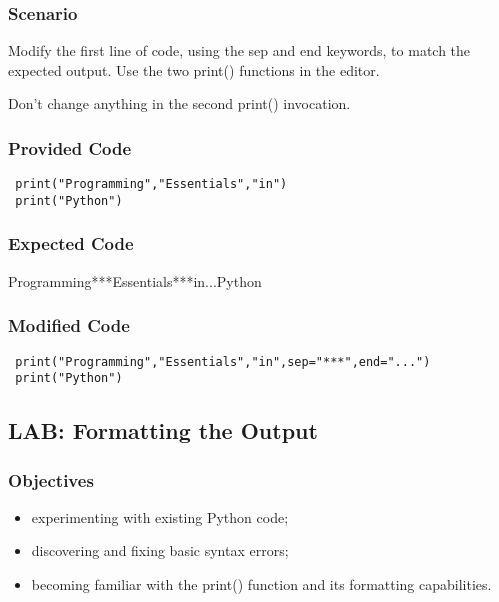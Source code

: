 \documentclass[a4paper,10pt]{article}
\begin{document}
\subsubsection{Scenario}
Modify the first line of code, using the {\selectfont sep} and {\selectfont end} keywords, to match the expected output. Use the two {\selectfont print()} functions in the editor.
\newline

Don't change anything in the second {\selectfont print()} invocation.
\newline

\subsubsection{Provided Code}
\begin{verbatim}
 print("Programming","Essentials","in")
 print("Python")
\end{verbatim}


\subsubsection{Expected Code}
{\selectfont Programming***Essentials***in...Python}
\newline

\subsubsection{Modified Code}
\begin{verbatim}
 print("Programming","Essentials","in",sep="***",end="...")
 print("Python")
\end{verbatim}

\subsection{LAB: Formatting the Output}
\subsubsection{Objectives}
\begin{itemize}
 \item experimenting with existing Python code;
 \item discovering and fixing basic syntax errors;
 \item becoming familiar with the {\selectfont print()} function and its formatting capabilities.
\end{itemize}
\end{document}
